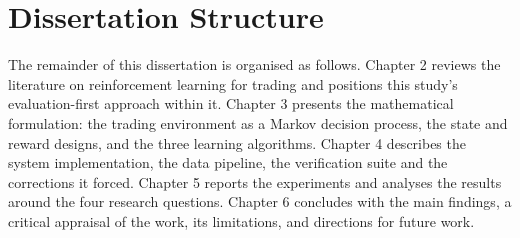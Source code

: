 \section{Dissertation Structure}

The remainder of this dissertation is organised as follows. Chapter 2
reviews the literature on reinforcement learning for trading and positions
this study's evaluation-first approach within it. Chapter 3 presents the
mathematical formulation: the trading environment as a Markov decision
process, the state and reward designs, and the three learning algorithms.
Chapter 4 describes the system implementation, the data pipeline, the
verification suite and the corrections it forced. Chapter 5 reports the
experiments and analyses the results around the four research questions.
Chapter 6 concludes with the main findings, a critical appraisal of the
work, its limitations, and directions for future work.
